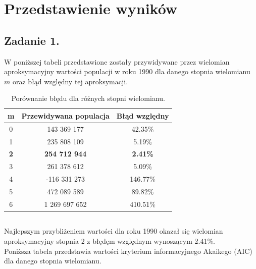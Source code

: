 \documentclass[11pt]{scrartcl}
\begin{document}
    \section{Przedstawienie wyników}
    \subsection{Zadanie 1.}
    W poniższej tabeli przedstawione zostały przywidywane przez wielomian
    aproksymacyjny wartości populacji w roku 1990 dla danego stopnia
    wielomianu $m$ oraz błąd względny tej aproksymacji.
    
    \begin{table}[H]
        \centering
        \renewcommand{\arraystretch}{1.5}
        \begin{tabular}{|c|c|c|}
            \hline
            \textbf{m} & \textbf{Przewidywana populacja} &
            \textbf{Błąd względny} \\
            \hline
            0 & 143 369 177 & 42.35\% \\
            \hline
            1 & 235 808 109 & 5.19\% \\
            \hline
            \textbf{2} & \textbf{254 712 944} & \textbf{2.41\%} \\
            \hline
            3 & 261 378 612 & 5.09\% \\
            \hline
            4 & -116 331 273 & 146.77\% \\
            \hline
            5 & 472 089 589 & 89.82\% \\
            \hline
            6 & 1 269 697 652 & 410.51\% \\
            \hline
        \end{tabular}
        \caption{Porównanie błędu dla różnych stopni wielomianu.}
    \end{table}

    \subsection*{}
    Najlepszym przybliżeniem wartości dla roku 1990 okazał się wielomian
    aproksymacyjny stopnia 2 z błędęm względnym wynoszącym 2.41\%. \\
    Poniższa tabela przedstawia wartości kryterium informacyjnego Akaikego
    (AIC) dla danego stopnia wielomianu.
\end{document}
